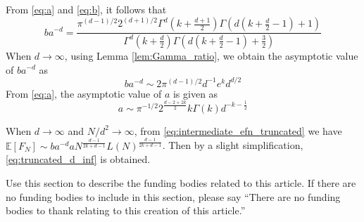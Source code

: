 \documentclass{aptpub}
\def\E{\mathbb{E}}
\begin{document}
From \eqref{eq:a} and \eqref{eq:b}, it follows that
\begin{equation}
     ba^{-d}
     = \frac{\pi^{(d-1)/2} 2^{(d+1)/2}
     \Gamma^d(k+\frac{d+1}{2})
     \Gamma(d(k+\frac{d}{2}-1)+1)}{\Gamma^d(k+\frac{d}{2})\Gamma(d(k+\frac{d}{2}-1)+ \frac{3}{2})}
 \end{equation}
 When $d\to \infty$, using Lemma \ref{lem:Gamma_ratio},
 we obtain the asymptotic value of $ba^{-d}$ as
 \begin{equation}
     ba^{-d} \sim 2\pi^{(d-1)/2}
     d^{-1}e^kd^{d/2}
 \end{equation}
 From \eqref{eq:a}, the asymptotic value of $a$ is given as
 \begin{equation}
     a \sim \pi^{-1/2} 2^{\frac{d-2+2k}{2}} k \Gamma(k) d^{-k-\frac{1}{2}}
 \end{equation}

When $d\to \infty$ and $N/d^2\to \infty$,
from \eqref{eq:intermediate_efn_truncated}
we have $\E[F_N] \sim ba^{-d} a N^{\frac{d-1}{2k+d-1}}
L(N)
^{\frac{d-1}{2k+d-1}}$.
Then by a slight simplification,
\eqref{eq:truncated_d_inf} is obtained.
 






\fund %
\noindent Use this section to describe the funding bodies related to this article. If there are no funding bodies to include in this section, please say ``There are no funding bodies to thank relating to this creation of this article.''
\end{document}
